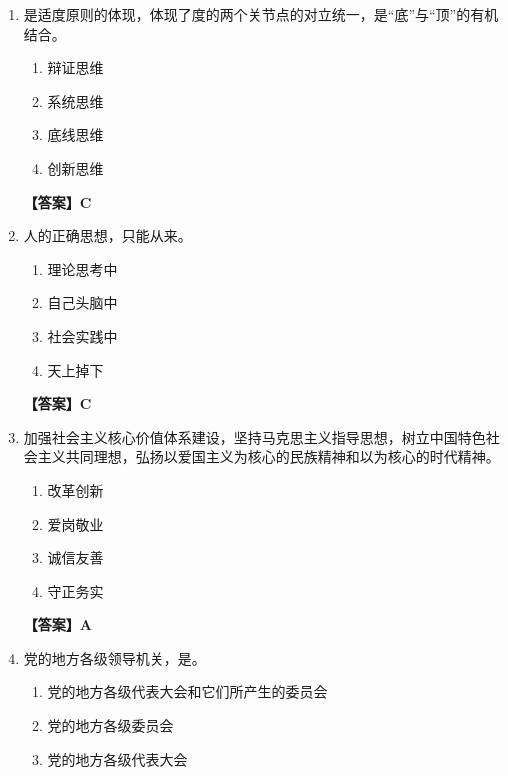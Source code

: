 \documentclass[UTF8,11pt,a4paper]{ctexart}
\begin{document}
\begin{enumerate}[label=\textbf{\arabic*.}, leftmargin=2.5em, itemsep=0.7em]
\begin{enumerate}[label=\Alph*., leftmargin=2em, itemsep=0.1em, topsep=0.15em]
\item 核心观点
\item 基本观点
\item 重要观点
\item 一般观点
\end{enumerate}
\textbf{【答案】A}
\item \allowbreak\underline{\hspace{4em}}是适度原则的体现，体现了度的两个关节点的对立统一，是“底”与“顶”的有机结合。
\begin{enumerate}[label=\Alph*., leftmargin=2em, itemsep=0.1em, topsep=0.15em]
\item 辩证思维
\item 系统思维
\item 底线思维
\item 创新思维
\end{enumerate}
\textbf{【答案】C}
\item 人的正确思想，只能从\allowbreak\underline{\hspace{4em}}来。
\begin{enumerate}[label=\Alph*., leftmargin=2em, itemsep=0.1em, topsep=0.15em]
\item 理论思考中
\item 自己头脑中
\item 社会实践中
\item 天上掉下
\end{enumerate}
\textbf{【答案】C}
\item 加强社会主义核心价值体系建设，坚持马克思主义指导思想，树立中国特色社会主义共同理想，弘扬以爱国主义为核心的民族精神和以\allowbreak\underline{\hspace{4em}}为核心的时代精神。
\begin{enumerate}[label=\Alph*., leftmargin=2em, itemsep=0.1em, topsep=0.15em]
\item 改革创新
\item 爱岗敬业
\item 诚信友善
\item 守正务实
\end{enumerate}
\textbf{【答案】A}
\item 党的地方各级领导机关，是\allowbreak\underline{\hspace{4em}}。
\begin{enumerate}[label=\Alph*., leftmargin=2em, itemsep=0.1em, topsep=0.15em]
\item 党的地方各级代表大会和它们所产生的委员会
\item 党的地方各级委员会
\item 党的地方各级代表大会

\end{enumerate}
\end{enumerate}
\end{document}
